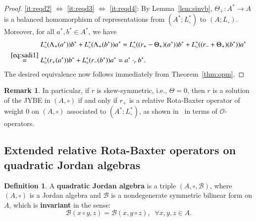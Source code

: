 \documentclass[12pt, reqno, a4paper]{amsart}
\theoremstyle{definition}
\newtheorem{definition}[theorem]{Definition}
\newtheorem{remark}[theorem]{Remark}
\begin{document}
\begin{proof}
\ref{it:reqd2} $\Longleftrightarrow$ \ref{it:reqd3} $\Longleftrightarrow$ \ref{it:reqd4}:  By Lemma~\ref{lem:sinvb}, $\Theta_{+}: A^* \to A$ is a balanced homomorphism of representations from $(A^*; L_{\circ}^*)$ to $(A; L_{\circ})$.
	Moreover, for all $a^*, b^* \in A^*$, we have
	\begin{align*}
		& L_{\circ}^*(\Lambda_{+}(a^*))b^* + L_{\circ}^*(\Lambda_{+}(b^*))a^* = L_{\circ}^*((r_{+}-\Theta_{+})(a^*))b^* + L_{\circ}^*((r_{-}+\Theta_{+})(b^*))a^* \\
		\overset{\eqref{eq:sadi1}}{=}\; & L_{\circ}^*(r_{+}(a^*)) b^* + L_{\circ}^*(r_{-}(b^*)) a^* = a^* \cdot_{r} b^*.
	\end{align*}
	The desired equivalence now follows immediately from Theorem~\ref{thm:opm}.
\end{proof}

\begin{remark}
	In particular, if $r$ is skew-symmetric, i.e., $\Theta=0$, then $r$ is a solution of the JYBE in $(A, \circ)$ if and only if $r_{+}$ is a relative Rota-Baxter operator of weight 0 on $(A, \circ)$ associated to $(A^*; L_{\circ}^*)$, as shown in~\cite[Proposition~3.1]{hou2013pre} in terms of $\mathcal{O}$-operators.
\end{remark}


\subsection{Extended relative Rota-Baxter operators on quadratic Jordan algebras}

\begin{definition}
	A \textbf{quadratic Jordan algebra} is a triple $(A, \circ, \mathcal{B})$, where $(A, \circ)$ is a Jordan algebra and $\mathcal{B}$ is a nondegenerate symmetric bilinear form on $A$, which is \textbf{invariant} in the sense:
	\begin{equation*}
		\mathcal{B}(x \circ y, z)=\mathcal{B}(x, y \circ z), \;\; \forall x, y, z \in A.
	\end{equation*}
\end{definition}
\end{document}
